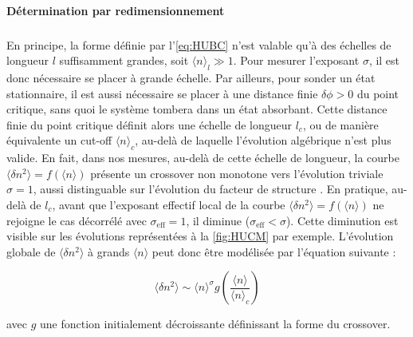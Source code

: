 \paragraph{Détermination par redimensionnement}

\subparagraph{}En principe, la forme définie par l'\autoref{eq:HUBC} n'est valable qu'à des échelles de longueur $l$ suffisamment grandes, soit $\langle n \rangle_l \gg 1$. Pour mesurer l'exposant $\sigma$, il est donc nécessaire se placer à grande échelle. Par ailleurs, pour sonder un état stationnaire, il est aussi nécessaire se placer à une distance finie $\delta\phi>0$ du point critique, sans quoi le système tombera dans un état absorbant. Cette distance finie du point critique définit alors une échelle de longueur $l_c$, ou de manière équivalente un cut-off $\langle n \rangle_c$, au-delà de laquelle l'évolution algébrique n'est plus valide. En fait, dans nos mesures, au-delà de cette échelle de longueur, la courbe $\langle \delta n^2 \rangle = f(\langle n \rangle)$ présente un crossover non monotone vers l'évolution triviale $\sigma = 1$, aussi distinguable sur l'évolution du facteur de structure \cite{hexner_hyperuniformity_2015,hexner_noise_2017, hexner_enhanced_2017 }. En pratique, au-delà de $l_c$, avant que l'exposant effectif local de la courbe $\langle \delta n^2 \rangle = f(\langle n \rangle)$ ne rejoigne le cas décorrélé avec $\sigma_\text{eff}=1$, il diminue ($\sigma_\text{eff}<\sigma$). Cette diminution est visible sur les évolutions représentées à la \autoref{fig:HUCM} par exemple. L'évolution globale de $\langle \delta n^2 \rangle$ à grands $\langle n \rangle$ peut donc être modélisée par l'équation suivante :

\begin{equation}
	\langle \delta n^2 \rangle \sim \langle n \rangle^\sigma g\left( \frac{\langle n \rangle}{\langle n \rangle_c} \right)
\end{equation}

\noindent avec $g$ une fonction initialement décroissante définissant la forme du crossover.

